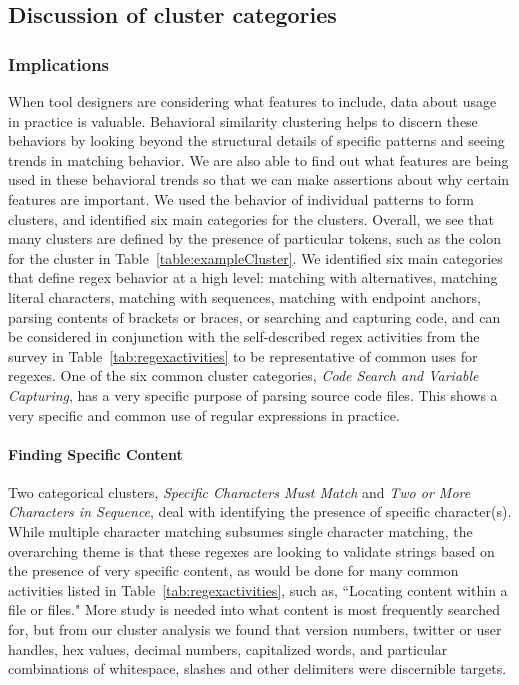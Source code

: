 \subsection{Discussion of cluster categories}
\subsubsection{Implications}
When tool designers are considering what features to include, data about usage in practice is valuable.  Behavioral similarity clustering  helps to discern these behaviors by looking beyond the structural details of specific patterns and seeing trends in  matching behavior. We are also able to find out what features are being used in these behavioral trends so that we can make assertions about why certain features are important.
We used the behavior of individual patterns to form clusters, and identified six main categories for the clusters.
 Overall, we see that many clusters are defined by the presence of particular tokens, such as the colon for the cluster in Table~\ref{table:exampleCluster}.
We identified six main categories that define regex behavior at a high level: matching with alternatives, matching literal characters, matching with sequences, matching with endpoint anchors, parsing contents of brackets or braces, or searching and capturing code, and can be considered in conjunction with the self-described regex activities from the survey in Table~\ref{tab:regexactivities} to be representative of common uses for regexes.
One of the six common cluster categories, \emph{Code Search and Variable Capturing}, has a very specific purpose of parsing source code files. This shows a very specific and common use of regular expressions in practice.

\paragraph{Finding Specific Content}
Two categorical clusters, \emph{Specific Characters Must Match} and \emph{Two or More Characters in Sequence}, deal with identifying the presence of specific character(s).
While multiple character matching subsumes single character matching, the overarching theme is that these regexes are looking to validate strings based on the presence of very specific content, as would be done for many common activities listed in Table~\ref{tab:regexactivities}, such as, ``Locating content within a file or files."
More study is needed into what content is most frequently searched for, but from our cluster analysis we found that version numbers, twitter or user handles, hex values, decimal numbers, capitalized words, and particular combinations of whitespace, slashes and other delimiters were discernible targets.

